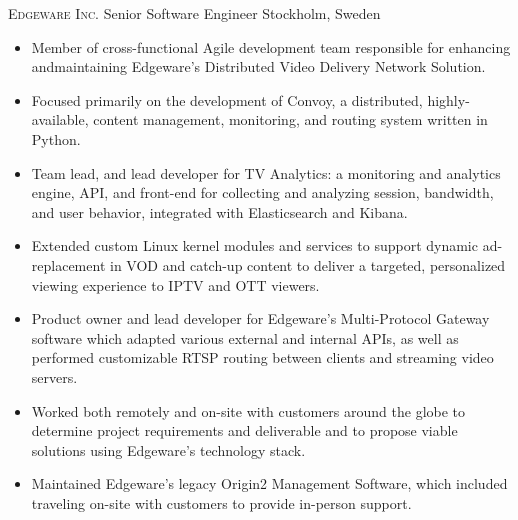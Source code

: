 \documentclass[11pt,letterpaper,roman]{moderncv} %
\begin{document}
			{\textsc{Edgeware Inc.}}			{Senior Software Engineer}			{Stockholm, Sweden}	{}
	{
	\begin{itemize}
		\item Member of cross-functional Agile development team responsible for enhancing andmaintaining Edgeware's Distributed Video Delivery Network Solution.
		\item Focused primarily on the development of Convoy, a distributed, highly-available, content management, monitoring, and routing system written in Python. 
		\item Team lead, and lead developer for TV Analytics: a monitoring and analytics engine, API, and front-end for collecting and analyzing session, bandwidth, and user behavior, integrated with Elasticsearch and Kibana.
		\item Extended custom Linux kernel modules and services to support dynamic ad-replacement in VOD and catch-up content to deliver a targeted, personalized viewing experience to IPTV and OTT viewers.
		\item Product owner and lead developer for Edgeware's Multi-Protocol Gateway software which adapted various external and internal APIs, as well as performed customizable RTSP routing between clients and streaming video servers.
		\item Worked both remotely and on-site with customers around the globe to determine project requirements and deliverable and to propose viable solutions using Edgeware's technology stack.
		\item Maintained Edgeware's legacy Origin2 Management Software, which included traveling on-site with customers to provide in-person support.
	\end{itemize}
	}
\end{document}
